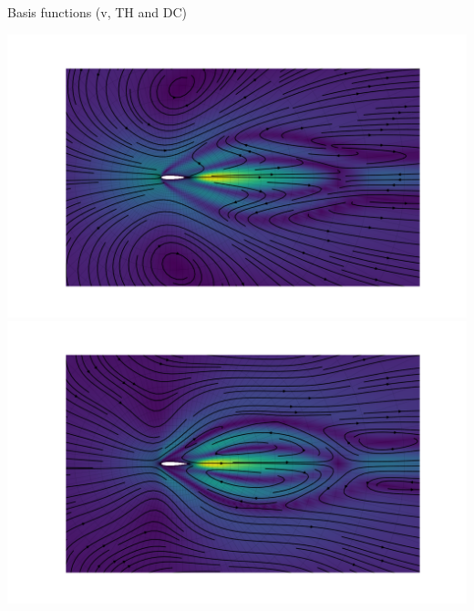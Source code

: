 \documentclass{beamer}
\begin{document}
\begin{frame}{Basis functions (v, TH and DC)}
  \begin{center}
    \includegraphics[trim={90mm 0 95mm 0},clip,height=0.95\textheight]{figs/bfun-v-no-piola-v002}
    \includegraphics[trim={90mm 0 95mm 0},clip,height=0.95\textheight]{figs/bfun-v-piola-v002}
  \end{center}
\end{frame}
\end{document}
